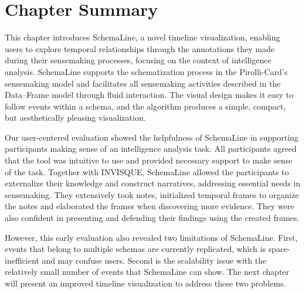 \section{Chapter Summary}
This chapter introduces SchemaLine, a novel timeline visualization, enabling users to explore temporal relationships through the annotations they made during their sensemaking processes, focusing on the context of intelligence analysis. SchemaLine supports the schematization process in the Pirolli-Card's sensemaking model and facilitates all sensemaking activities described in the Data--Frame model through fluid interaction. The visual design makes it easy to follow events within a schema, and the algorithm produces a simple, compact, but aesthetically pleasing visualization.

Our user-centered evaluation showed the helpfulness of SchemaLine in supporting participants making sense of an intelligence analysis task. All participants agreed that the tool was intuitive to use and provided necessary support to make sense of the task. Together with INVISQUE, SchemaLine allowed the participants to externalize their knowledge and construct narratives, addressing essential needs in sensemaking. They extensively took notes, initialized temporal frames to organize the notes and elaborated the frames when discovering more evidence. They were also confident in presenting and defending their findings using the created frames.

However, this early evaluation also revealed two limitations of SchemaLine. First, events that belong to multiple schemas are currently replicated, which is space-inefficient and may confuse users. Second is the scalability issue with the relatively small number of events that SchemaLine can show. The next chapter will present an improved timeline visualization to address these two problems.